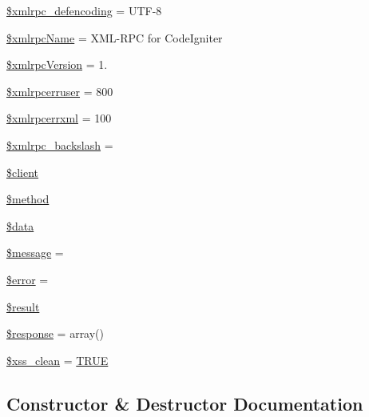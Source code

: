 \begin{DoxyCompactItemize}
\item 
\mbox{\hyperlink{class_c_i___xmlrpc_a7a31af447cebbb81b1f3c5581cd90d5a}{\$xmlrpc\+\_\+defencoding}} = \textquotesingle{}U\+TF-\/8\textquotesingle{}
\item 
\mbox{\hyperlink{class_c_i___xmlrpc_a1311a8891b845bf89b1bc459d54a6312}{\$xmlrpc\+Name}} = \textquotesingle{}X\+ML-\/R\+PC for Code\+Igniter\textquotesingle{}
\item 
\mbox{\hyperlink{class_c_i___xmlrpc_a4130f55bb1f23dcabf9cf3ae5f5a746d}{\$xmlrpc\+Version}} = \textquotesingle{}1.\textquotesingle{}
\item 
\mbox{\hyperlink{class_c_i___xmlrpc_a45bf41f1e861f94e04f463a638e5abf5}{\$xmlrpcerruser}} = 800
\item 
\mbox{\hyperlink{class_c_i___xmlrpc_af2500be600bfad88988409e6ff64c01c}{\$xmlrpcerrxml}} = 100
\item 
\mbox{\hyperlink{class_c_i___xmlrpc_a2bfcef776e3e3cd8f7700e375c6ccaec}{\$xmlrpc\+\_\+backslash}} = \textquotesingle{}\textquotesingle{}
\item 
\mbox{\hyperlink{class_c_i___xmlrpc_ad1405dc1ba2e288764378e79bff7a87d}{\$client}}
\item 
\mbox{\hyperlink{class_c_i___xmlrpc_a12661b2fc0f57f97e30a1620889ce9c6}{\$method}}
\item 
\mbox{\hyperlink{class_c_i___xmlrpc_a6efc15b5a2314dd4b5aaa556a375c6d6}{\$data}}
\item 
\mbox{\hyperlink{class_c_i___xmlrpc_abf17cb2dba2ed17cb28aa5f37deb5293}{\$message}} = \textquotesingle{}\textquotesingle{}
\item 
\mbox{\hyperlink{class_c_i___xmlrpc_aeba2ab722cedda53dbb7ec1a59f45550}{\$error}} = \textquotesingle{}\textquotesingle{}
\item 
\mbox{\hyperlink{class_c_i___xmlrpc_a112ef069ddc0454086e3d1e6d8d55d07}{\$result}}
\item 
\mbox{\hyperlink{class_c_i___xmlrpc_af4b6fb1bbc77ccc05f10da3b16935b99}{\$response}} = array()
\item 
\mbox{\hyperlink{class_c_i___xmlrpc_a0f2ee8861c0b3164a5c6e126dd98c0cc}{\$xss\+\_\+clean}} = \mbox{\hyperlink{constants_8php_ae04a3efe6aa42044f803ee90c2277846}{T\+R\+UE}}
\end{DoxyCompactItemize}


\subsection{Constructor \& Destructor Documentation}
\mbox{\label{class_c_i___xmlrpc_af7f9493844d2d66e924e3c1df51ce616}} 

